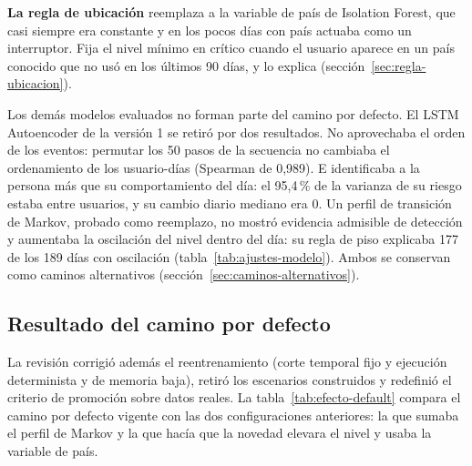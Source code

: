\textbf{La regla de ubicación} reemplaza a la variable de país de Isolation Forest, que casi siempre era constante y en los pocos días con país actuaba como un interruptor. Fija el nivel mínimo en crítico cuando el usuario aparece en un país conocido que no usó en los últimos 90 días, y lo explica (sección~\ref{sec:regla-ubicacion}).

Los demás modelos evaluados no forman parte del camino por defecto. El LSTM Autoencoder de la versión 1 se retiró por dos resultados. No aprovechaba el orden de los eventos: permutar los 50 pasos de la secuencia no cambiaba el ordenamiento de los usuario-días (Spearman de 0,989). E identificaba a la persona más que su comportamiento del día: el 95,4\,\% de la varianza de su riesgo estaba entre usuarios, y su cambio diario mediano era 0. Un perfil de transición de Markov, probado como reemplazo, no mostró evidencia admisible de detección y aumentaba la oscilación del nivel dentro del día: su regla de piso explicaba 177 de los 189 días con oscilación (tabla~\ref{tab:ajustes-modelo}). Ambos se conservan como caminos alternativos (sección~\ref{sec:caminos-alternativos}).

\subsection{Resultado del camino por defecto}
\label{sec:revision-evolucion}
La revisión corrigió además el reentrenamiento (corte temporal fijo y ejecución determinista y de memoria baja), retiró los escenarios construidos y redefinió el criterio de promoción sobre datos reales. La tabla~\ref{tab:efecto-default} compara el camino por defecto vigente con las dos configuraciones anteriores: la que sumaba el perfil de Markov y la que hacía que la novedad elevara el nivel y usaba la variable de país.

